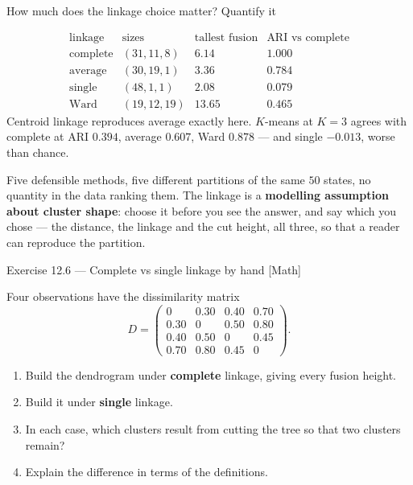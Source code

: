 \documentclass[aspectratio=169,11pt]{beamer}
\begin{document}
\begin{frame}{How much does the linkage choice matter? Quantify it}
  \scriptsize
  \begin{numexample}[{{Standardised \texttt{USArrests}, Euclidean, cut into $K=3$}}]
    \[
      \begin{array}{l|c|c|c}
        \text{linkage} & \text{sizes} & \text{tallest fusion} & \text{ARI vs complete}\\ \hline
        \text{complete} & (31,11,8) & 6.14 & 1.000 \\
        \text{average}  & (30,19,1) & 3.36 & 0.784 \\
        \text{single}   & (48,1,1)  & 2.08 & 0.079 \\
        \text{Ward}     & (19,12,19)& 13.65& 0.465
      \end{array}
    \]
    Centroid linkage reproduces average exactly here. $K$-means at $K=3$ agrees with
    complete at ARI $0.394$, average $0.607$, Ward $0.878$ --- and single $-0.013$, worse
    than chance.
  \end{numexample}
  \begin{takeaway}
    Five defensible methods, five different partitions of the same $50$ states, no quantity
    in the data ranking them. The linkage is a \textbf{modelling assumption about cluster
    shape}: choose it before you see the answer, and say which you chose --- the distance,
    the linkage and the cut height, all three, so that a reader can reproduce the partition.
  \end{takeaway}
\end{frame}

\begin{frame}{Exercise 12.6 --- Complete vs single linkage by hand [Math]}
\begin{exercise}
  Four observations have the dissimilarity matrix
  \[
    D=\begin{pmatrix}
      0 & 0.30 & 0.40 & 0.70\\
      0.30 & 0 & 0.50 & 0.80\\
      0.40 & 0.50 & 0 & 0.45\\
      0.70 & 0.80 & 0.45 & 0
    \end{pmatrix}.
  \]
  \begin{enumerate}
    \item Build the dendrogram under \textbf{complete} linkage, giving every fusion height.
    \item Build it under \textbf{single} linkage.
    \item In each case, which clusters result from cutting the tree so that two clusters
          remain?
    \item Explain the difference in terms of the definitions.
  \end{enumerate}
\end{exercise}
\end{frame}
\end{document}
